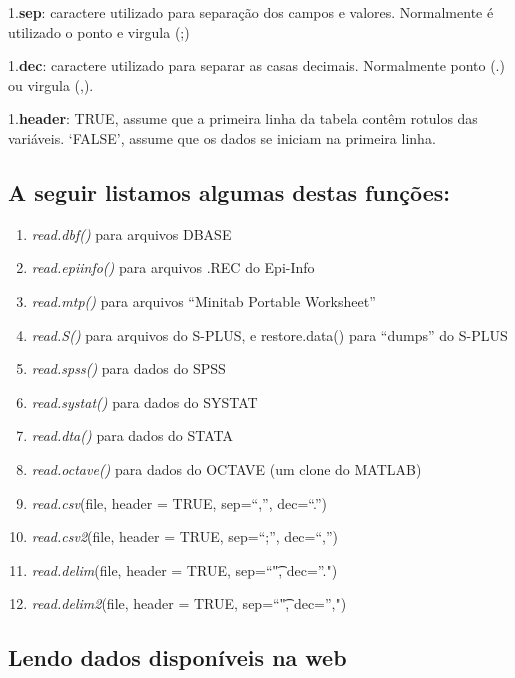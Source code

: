 \documentclass[]{book}
\providecommand{\tightlist}{%
  \setlength{\itemsep}{0pt}\setlength{\parskip}{0pt}}
\begin{document}
1.\textbf{sep}: caractere utilizado para separação dos campos e valores. Normalmente é utilizado o ponto e virgula (;)

1.\textbf{dec}: caractere utilizado para separar as casas decimais. Normalmente ponto (.) ou virgula (,).

1.\textbf{header}: TRUE, assume que a primeira linha da tabela contêm rotulos das variáveis. `FALSE', assume que os dados se iniciam na primeira linha.

\hypertarget{a-seguir-listamos-algumas-destas-funcoes}{%
\subsection{A seguir listamos algumas destas funções:}\label{a-seguir-listamos-algumas-destas-funcoes}}

\begin{enumerate}
\def\labelenumi{\arabic{enumi}.}
\tightlist
\item
  \emph{read.dbf()} para arquivos DBASE
\item
  \emph{read.epiinfo()} para arquivos .REC do Epi-Info
\item
  \emph{read.mtp()} para arquivos ``Minitab Portable Worksheet''
\item
  \emph{read.S()} para arquivos do S-PLUS, e restore.data() para ``dumps'' do S-PLUS
\item
  \emph{read.spss()} para dados do SPSS
\item
  \emph{read.systat()} para dados do SYSTAT
\item
  \emph{read.dta()} para dados do STATA
\item
  \emph{read.octave()} para dados do OCTAVE (um clone do MATLAB)
\item
  \emph{read.csv}(file, header = TRUE, sep=``,'', dec=``.'')
\item
  \emph{read.csv2}(file, header = TRUE, sep=``;'', dec=``,'')
\item
  \emph{read.delim}(file, header = TRUE, sep=``\t", dec=''.")
\item
  \emph{read.delim2}(file, header = TRUE, sep=``\t", dec='',")
\end{enumerate}

\hypertarget{lendo-dados-disponiveis-na-web}{%
\subsection{Lendo dados disponíveis na web}\label{lendo-dados-disponiveis-na-web}}
\end{document}
